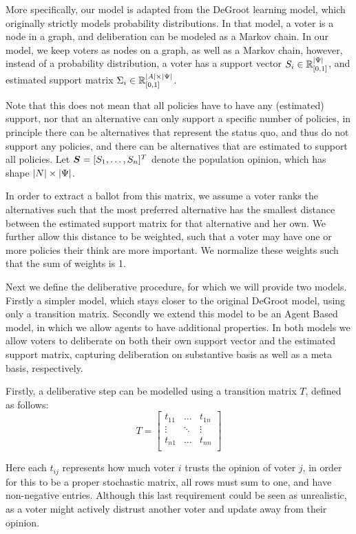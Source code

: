 More specifically, our model is adapted from the DeGroot learning model, which originally strictly models probability distributions. In that model, a voter is a node in a graph, and deliberation can be modeled as a Markov chain. In our model, we keep voters as nodes on a graph, as well as a Markov chain, however, instead of a probability distribution, a voter has a support vector $S_i \in \mathbb{R}^{|\Psi|}_{[0,1]}$, and estimated support matrix $\Sigma_i\in \mathbb{R}^{|A| \times |\Psi|}_{[0,1]}$.

Note that this does not mean that all policies have to have any (estimated) support, nor that an alternative can only support a specific number of policies, in principle there can be alternatives that represent the status quo, and thus do not support any policies, and there can be alternatives that are estimated to support all policies.  Let $\boldsymbol{S}= [S_1, \dots, S_{n}]^{T}$ denote the population opinion, which has shape \(|N| \times |\Psi|\).

In order to extract a ballot from this matrix, we assume a voter ranks the alternatives such that the most preferred alternative has the smallest distance between the estimated support matrix for that alternative and her own. We further allow this distance to be weighted, such that a voter may have one or more policies their think are more important. We normalize these weights such that the sum of weights is 1.

Next we define the deliberative procedure, for which we will provide two models. Firstly a simpler model, which stays closer to the original DeGroot model, using only a transition matrix. Secondly we extend this model to be an Agent Based model, in which we allow agents to have additional properties. In both models we allow voters to deliberate on both their own support vector and the estimated support matrix, capturing deliberation on substantive basis as well as a meta basis, respectively.

Firstly, a deliberative step can be modelled using a transition matrix $T$, defined as follows:
\[
	T=\begin{bmatrix}
		t_{11} & \dots  & t_{1n} \\
		\vdots & \ddots & \vdots \\
		t_{n1} & \dots  & t_{nn} \\
	\end{bmatrix}
\]

Here each $t_{ij}$ represents how much voter $i$ trusts the opinion of voter $j$, in order for this to be a proper stochastic matrix, all rows must sum to one, and have non-negative entries. Although this last requirement could be seen as unrealistic, as a voter might actively distrust another voter and update away from their opinion.

